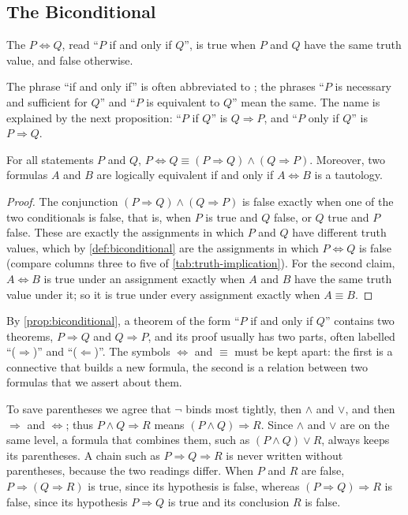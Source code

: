 \subsection{The Biconditional}

\begin{definition}[Biconditional]
\label{def:biconditional}
The  $P\Leftrightarrow Q$, read ``$P$ if and only if $Q$'', is true when $P$ and $Q$ have the same truth value, and false otherwise.
\end{definition}

The phrase ``if and only if'' is often abbreviated to ; the phrases ``$P$ is necessary and sufficient for $Q$'' and ``$P$ is equivalent to $Q$'' mean the same. The name is explained by the next proposition: ``$P$ if $Q$'' is $Q\Rightarrow P$, and ``$P$ only if $Q$'' is $P\Rightarrow Q$.

\begin{proposition}
\label{prop:biconditional}
For all statements $P$ and $Q$, $P\Leftrightarrow Q\equiv(P\Rightarrow Q)\wedge(Q\Rightarrow P)$. Moreover, two formulas $A$ and $B$ are logically equivalent if and only if $A\Leftrightarrow B$ is a tautology.
\end{proposition}

\begin{proof}
The conjunction $(P\Rightarrow Q)\wedge(Q\Rightarrow P)$ is false exactly when one of the two conditionals is false, that is, when $P$ is true and $Q$ false, or $Q$ true and $P$ false. These are exactly the assignments in which $P$ and $Q$ have different truth values, which by \cref{def:biconditional} are the assignments in which $P\Leftrightarrow Q$ is false (compare columns three to five of \cref{tab:truth-implication}). For the second claim, $A\Leftrightarrow B$ is true under an assignment exactly when $A$ and $B$ have the same truth value under it; so it is true under every assignment exactly when $A\equiv B$.
\end{proof}

By \cref{prop:biconditional}, a theorem of the form ``$P$ if and only if $Q$'' contains two theorems, $P\Rightarrow Q$ and $Q\Rightarrow P$, and its proof usually has two parts, often labelled ``($\Rightarrow$)'' and ``($\Leftarrow$)''. The symbols $\Leftrightarrow$ and $\equiv$ must be kept apart: the first is a connective that builds a new formula, the second is a relation between two formulas that we assert about them.

To save parentheses we agree that $\neg$ binds most tightly, then $\wedge$ and $\vee$, and then $\Rightarrow$ and $\Leftrightarrow$; thus $P\wedge Q\Rightarrow R$ means $(P\wedge Q)\Rightarrow R$. Since $\wedge$ and $\vee$ are on the same level, a formula that combines them, such as $(P\wedge Q)\vee R$, always keeps its parentheses. A chain such as $P\Rightarrow Q\Rightarrow R$ is never written without parentheses, because the two readings differ. When $P$ and $R$ are false, $P\Rightarrow(Q\Rightarrow R)$ is true, since its hypothesis is false, whereas $(P\Rightarrow Q)\Rightarrow R$ is false, since its hypothesis $P\Rightarrow Q$ is true and its conclusion $R$ is false.

